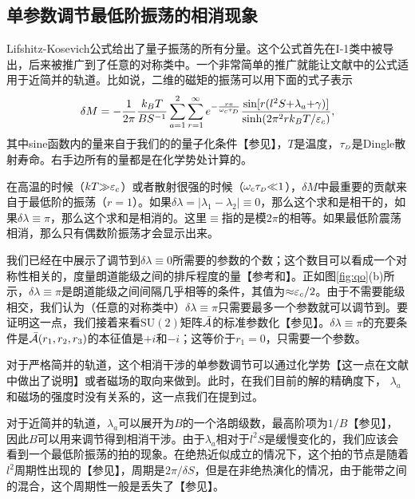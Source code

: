 \subsection{单参数调节最低阶振荡的相消现象}\label{sec:quantosc_equidis}


Lifshitz-Kosevich公式\cite{lifshitz_kosevich,lifshitz_kosevich_jetp}给出了量子振荡的所有分量。这个公式首先在I-1类中被导出\cite{rothmag}，后来被推广到了任意的对称类中\cite{topoferm}。一个非常简单的推广就能让文献中的公式适用于近简并的轨道。比如说，二维的磁矩的振荡可以用下面的式子表示
\begin{equation}
\delta M=-\frac{1}{2\pi}\frac{k_BT}{BS^{-1}}\sum_{a=1}^2\sum_{r=1}^{\infty}e^{-\frac{r\pi}{\omega_c\tau_{\scriptscriptstyle{D}}}} \frac{\text{sin}[r(l^2S{+}\lambda_a{+}\gamma)]}{\text{sinh}(2\pi^2rk_BT/\varepsilon_c)},\label{eq:LK}
\end{equation}
其中sine函数内的量来自于我们的的量子化条件【参见】，$T$是温度，$\tau_{\scriptscriptstyle{D}}$是Dingle散射寿命\cite{Dingle_collisions}。右手边所有的量都是在化学势处计算的。

在高温的时候（$kT{\gg}\varepsilon_c$）或者散射很强的时候（$\omega_c\tau_{\scriptscriptstyle{D}}{\ll}1$），$\delta M$中最重要的贡献来自于最低阶的振荡（$r{=}1$）。如果$\delta \lambda{=}|\lambda_1{-}\lambda_2|{\equiv}0$，那么这个求和是相干的，如果$\delta \lambda{\equiv}\pi$，那么这个求和是相消的。这里$\equiv$指的是模$2\pi$的相等。如果最低阶震荡相消，那么只有偶数阶振荡才会显示出来。

我们已经在中展示了调节到$\delta \lambda{\equiv}0$所需要的参数的个数；这个数目可以看成一个对称性相关的，度量朗道能级之间的排斥程度的量【参考和】。正如图\ref{fig:qo}(b)所示，$\delta \lambda{\equiv}\pi$是朗道能级之间间隔几乎相等的条件，其值为${\approx}\varepsilon_c/2$。由于不需要能级相交，我们认为（任意的对称类中）$\delta \lambda{\equiv}\pi$只需要最多一个参数就可以调节到。要证明这一点，我们接着来看$\text{SU}(2)$矩阵${\cal \bar{A}}$的标准参数化【参见】。$\delta \lambda{\equiv}\pi$的充要条件是${\cal \bar{A}}(r_1,r_2,r_3)$的本征值是$+i$和$-i$；这等价于$r_1{=}0$，只需要一个参数。

对于严格简并的轨道，这个相消干涉的单参数调节可以通过化学势【这一点在文献中做出了说明】或者磁场的取向来做到。此时，在我们目前的解的精确度下， $\lambda_a$和磁场的强度时没有关系的\cite{rothmag,fuchs_landau_2018,gao_zero-field_2017,fischbeck_review}，这一点我们在提到过。

对于近简并的轨道，$\lambda_a$可以展开为$B$的一个洛朗级数，最高阶项为$1/B$【参见】，因此$B$可以用来调节得到相消干涉。由于$\lambda_a$相对于$l^2S$是缓慢变化的，我们应该会看到一个最低阶振荡的拍的现象。在绝热近似成立的情况下，这个拍的节点是随着$l^2$周期性出现的【参见】，周期是$2\pi/\delta S$，但是在非绝热演化的情况，由于能带之间的混合，这个周期性一般是丢失了【参见】。

